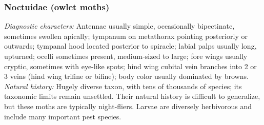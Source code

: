\documentclass[letterpaper, 11pt]{article}
\begin{document}
\subsubsection{Noctuidae (owlet moths)}
\noindent{}\textit{Diagnostic characters:} Antennae usually simple, occasionally bipectinate, sometimes swollen apically; tympanum on metathorax pointing posteriorly or outwards; tympanal hood located posterior to spiracle; labial palps usually long, upturned; ocelli sometimes present, medium-sized to large; fore wings usually cryptic, sometimes with eye-like spots; hind wing cubital vein branches into 2 or 3 veins (hind wing trifine or bifine); body color usually dominated by browns.\\

\noindent{}\textit{Natural history:} Hugely diverse taxon, with tens of thousands of species; its taxonomic limits remain unsettled. Their natural history is difficult to generalize, but these moths are typically night-fliers. Larvae are diversely herbivorous and include many important pest species.
\end{document}
